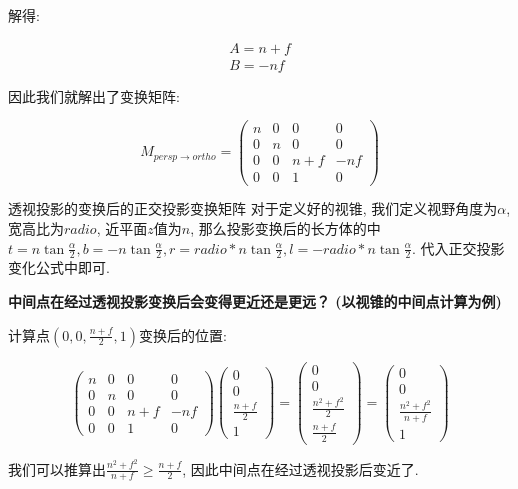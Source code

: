 解得: 

\begin{equation}
	\begin{split}
		A=n+f\\
		B=-nf
	\end{split}
\end{equation}

因此我们就解出了变换矩阵: 

\begin{equation}
	M_{persp\rightarrow ortho}=\begin{pmatrix}n&0&0&0\\0&n&0&0\\0&0&n+f&-nf\\0&0&1&0\end{pmatrix}
\end{equation}

\begin{titledbox}{透视投影的变换后的正交投影变换矩阵}
	对于定义好的视锥, 我们定义视野角度为$\alpha$, 宽高比为$radio$, 近平面$z$值为$n$, 那么投影变换后的长方体的中$t=n\tan{\frac{\alpha}{2}}, b=-n\tan{\frac{\alpha}{2}}, r=radio*n\tan{\frac{\alpha}{2}},l=-radio*n\tan{\frac{\alpha}{2}}$. 代入正交投影变化公式中即可. 
\end{titledbox}

\begin{question}
	\textbf{中间点在经过透视投影变换后会变得更近还是更远？ (以视锥的中间点计算为例) }
	
	计算点$(0,0,\frac{n+f}{2},1)$变换后的位置: 
	
	\begin{equation}
		\begin{pmatrix}n&0&0&0\\0&n&0&0\\0&0&n+f&-nf\\0&0&1&0\end{pmatrix}\begin{pmatrix}0\\0\\\frac{n+f}{2}\\1\end{pmatrix} = \begin{pmatrix}0\\0\\\frac{n^2+f^2}{2}\\\frac{n+f}{2}\end{pmatrix} =  \begin{pmatrix}0\\0\\\frac{n^2+f^2}{n+f}\\1\end{pmatrix}
	\end{equation}

	我们可以推算出$\frac{n^2+f^2}{n+f}\ge\frac{n+f}{2}$, 因此中间点在经过透视投影后变近了. 
\end{question}

